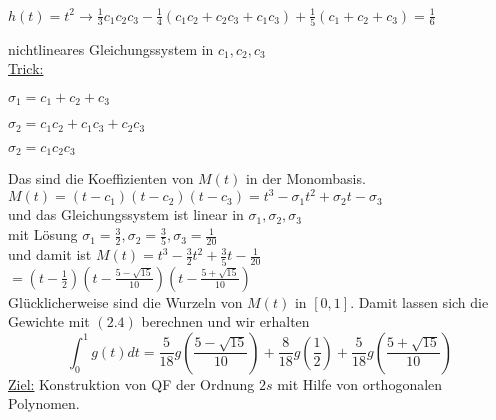 \begin{nothing}
\begin{enumerate}
\begin{description}
      \item $h(t) = t^2 \rightarrow \frac{1}{3}c_1c_2c_3 - \frac{1}{4}(c_1c_2 + c_2c_3 + c_1c_3) + \frac{1}{5}(c_1+c_2+c_3) = \frac{1}{6}$
    \end{description}
    nichtlineares Gleichungssystem in $c_1, c_2, c_3$ \\
    \underline{Trick:}
    \begin{description}
      \item $\sigma_1 = c_1+c_2+c_3$
      \item $\sigma_2 = c_1c_2 + c_1c_3 + c_2c_3$
      \item $\sigma_2 = c_1c_2c_3$
    \end{description} 
    Das sind die Koeffizienten von $M(t)$ in der Monombasis. \\
    $M(t) = (t-c_1)(t-c_2)(t-c_3) = t^3 - \sigma_1t^2 + \sigma_2t - \sigma_3$ \\
    und das Gleichungssystem ist linear in $\sigma_1, \sigma_2, \sigma_3$ \\
    mit Lösung $\sigma_1 = \frac{3}{2}, \sigma_2 = \frac{3}{5}, \sigma_3 = \frac{1}{20}$ \\
    und damit ist $M(t) = t^3 - \frac{3}{2}t^2 + \frac{3}{5}t - \frac{1}{20}$ \\
    $ = (t-\frac{1}{2})(t-\frac{5-\sqrt{15}}{10})(t-\frac{5 + \sqrt{15}}{10})$ \\
    Glücklicherweise sind die Wurzeln von $M(t)$ in $[0,1]$. Damit lassen sich die Gewichte mit $(2.4)$ berechnen und wir erhalten
    $$\int_0^1 g(t) dt = \frac{5}{18} g\left(\frac{5-\sqrt{15}}{10}\right) + \frac{8}{18} g\left(\frac{1}{2}\right) + \frac{5}{18}g\left(\frac{5+\sqrt{15}}{10}\right)$$
    \underline{Ziel:} Konstruktion von QF der Ordnung $2s$ mit Hilfe von orthogonalen Polynomen.
\end{enumerate}
\end{nothing}
